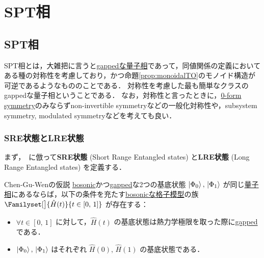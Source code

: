 \documentclass[TQFT_main]{subfiles}
\begin{document}
\setcounter{chapter}{4}

\chapter{SPT相}


\section{SPT相}

SPT相とは，大雑把に言うと\hyperref[def:quantum-phase]{gappedな量子相}であって，同値関係の定義においてある種の対称性を考慮しており，かつ命題\ref{prop:monoidalTO}のモノイド構造が可逆であるようなもののことである．
対称性を考慮した最も簡単なクラスのgappedな量子相ということである．
なお，対称性と言ったときに，\hyperref[def:p-form-sym]{0-form symmetry}のみならずnon-invertible symmetryなどの一般化対称性や，subsystem symmetry, modulated symmetryなどを考えても良い．


\subsection{SRE状態とLRE状態}

まず，~\cite[p.3]{ChenGuWen2010}に倣って\textbf{SRE状態} (Short Range Entangled states) と\textbf{LRE状態} (Long Range Entangled states) を定義する．
~\cite[p.4]{ChenGuWen2010}
\begin{myconjph}[label=conj:CGW]{Chen-Gu-Wenの仮説}
    \hyperref[def:bosonic-lattice-model]{bosonic}かつ\hyperref[def:gapped]{gapped}な2つの基底状態 $\ket{\Phi_0},\, \ket{\Phi_1}$ が同じ\hyperref[def:quantum-phase]{量子相}にあるならば，以下の条件を充たす\hyperref[def:bosonic-lattice-model]{bosonicな格子模型}の族 $\Familyset[\big]{\hat{H}(t)}{t \in [0,\, 1]}$ が存在する：
    \begin{itemize}
        \item $\forall t \in [0,\, 1]$ に対して，$\hat{H}(t)$ の基底状態は熱力学極限を取った際に\hyperref[def:gapped]{gapped}である．
        \item $\ket{\Phi_0},\, \ket{\Phi_1}$ はそれぞれ $\hat{H}(0),\, \hat{H}(1)$ の基底状態である．
    \end{itemize}
\end{myconjph}
\end{document}
